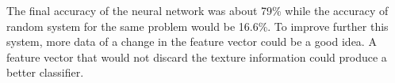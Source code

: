 \documentclass{IEEEtran}
\begin{document}
The final accuracy of the neural network was about 79\% while the accuracy of random system for the same problem would
be 16.6\%. To improve further this system, more data of a change in the feature vector could be a good idea. A
feature vector that would not discard the texture information could produce a better classifier.



\end{document}
